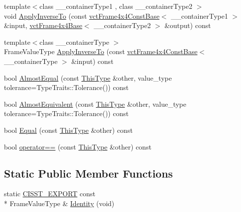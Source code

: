 \begin{DoxyCompactItemize}
\item 
{\footnotesize template$<$class \-\_\-\-\_\-container\-Type1 , class \-\_\-\-\_\-container\-Type2 $>$ }\\void \hyperlink{classvct_frame4x4_const_base_a1a1a408b9d5d40ddbd922c7e88d301de}{Apply\-Inverse\-To} (const \hyperlink{classvct_frame4x4_const_base}{vct\-Frame4x4\-Const\-Base}$<$ \-\_\-\-\_\-container\-Type1 $>$ \&input, \hyperlink{classvct_frame4x4_base}{vct\-Frame4x4\-Base}$<$ \-\_\-\-\_\-container\-Type2 $>$ \&output) const 
\item 
{\footnotesize template$<$class \-\_\-\-\_\-container\-Type $>$ }\\Frame\-Value\-Type \hyperlink{classvct_frame4x4_const_base_ac0efcdba37b56fd276148ddff72a84f0}{Apply\-Inverse\-To} (const \hyperlink{classvct_frame4x4_const_base}{vct\-Frame4x4\-Const\-Base}$<$ \-\_\-\-\_\-container\-Type $>$ \&input) const 
\item 
bool \hyperlink{classvct_frame4x4_const_base_a232d5b0f78d1f59acaa99acf5ff48d33}{Almost\-Equal} (const \hyperlink{classvct_frame4x4_const_base_acb37107e49c20bd15139ff196aff1087}{This\-Type} \&other, value\-\_\-type tolerance=Type\-Traits\-::\-Tolerance()) const 
\item 
bool \hyperlink{classvct_frame4x4_const_base_aeb1226096b5e7b1dacd675406a8637e3}{Almost\-Equivalent} (const \hyperlink{classvct_frame4x4_const_base_acb37107e49c20bd15139ff196aff1087}{This\-Type} \&other, value\-\_\-type tolerance=Type\-Traits\-::\-Tolerance()) const 
\end{DoxyCompactItemize}
{\bf }\par
\begin{DoxyCompactItemize}
\item 
bool \hyperlink{classvct_frame4x4_const_base_a385a9f4800f03e5ec2000b05594114ab}{Equal} (const \hyperlink{classvct_frame4x4_const_base_acb37107e49c20bd15139ff196aff1087}{This\-Type} \&other) const 
\item 
bool \hyperlink{classvct_frame4x4_const_base_a366fbd9659cb7829ad43e9f60ae9c80f}{operator==} (const \hyperlink{classvct_frame4x4_const_base_acb37107e49c20bd15139ff196aff1087}{This\-Type} \&other) const 
\end{DoxyCompactItemize}

\subsection*{Static Public Member Functions}
\begin{DoxyCompactItemize}
\item 
static \hyperlink{cmn_export_macros_8h_a99393e0c3ac434b2605235bbe20684f8}{C\-I\-S\-S\-T\-\_\-\-E\-X\-P\-O\-R\-T} const \\*
Frame\-Value\-Type \& \hyperlink{classvct_frame4x4_const_base_aef7591558ad3e333ff624bc9e508970a}{Identity} (void)
\end{DoxyCompactItemize}


